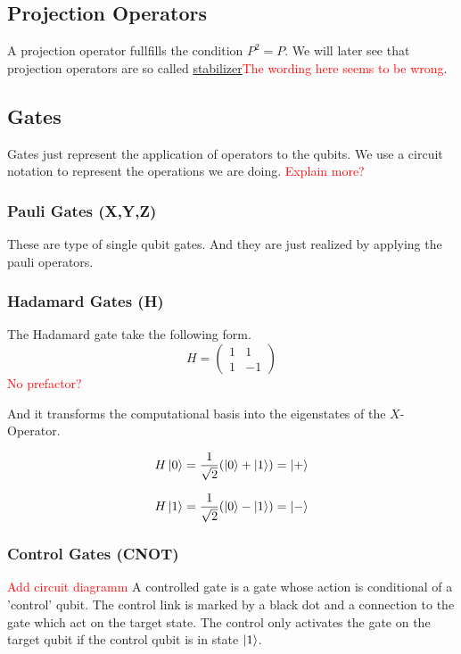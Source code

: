 \subsection{Projection Operators}\label{sec:basic.math.projection_operator}
A projection operator fullfills the condition $P^2=P$.
We will later see that projection operators are so called \hyperref[sec:basic.qc.stabilizer]{stabilizer}\textcolor{red}{The wording here seems to be wrong}.


\subsection{Gates}\label{sec:basic.math.gates}
Gates just represent the application of operators to the qubits. 
We use a circuit notation to represent the operations we are doing.
\textcolor{red}{Explain more?}


\subsubsection{Pauli Gates (X,Y,Z)}\label{sec:basic.math.gates.paui}
These are type of single qubit gates. And they are just realized by applying the pauli operators. 


\subsubsection{Hadamard Gates (H)}\label{sec:basic.math.gates.hadamard}
The Hadamard gate take the following form.
\begin{equation}
H=    
\begin{pmatrix}
1 & 1  \\
1 & -1  
\end{pmatrix}
\end{equation}
\textcolor{red}{No prefactor?}

And it transforms the computational basis into the eigenstates of the $X$-Operator.

\begin{equation}
    H\ket{0} = \frac{1}{\sqrt{2}} (\ket{0} + \ket{1}) = \ket{+}
\end{equation}

\begin{equation}
    H\ket{1} = \frac{1}{\sqrt{2}} (\ket{0} - \ket{1}) = \ket{-}
\end{equation}
\cite{QECintro}


\subsubsection{Control Gates (CNOT)}\label{sec:basic.math.gates.cnot}
\textcolor{red}{Add circuit diagramm}
A controlled gate is a gate whose action is conditional of a 'control' qubit.
The control link is marked by a black dot and a connection to the gate which act on the target state. 
The control only activates the gate on the target qubit if the control qubit is in state $\ket{1}$.

